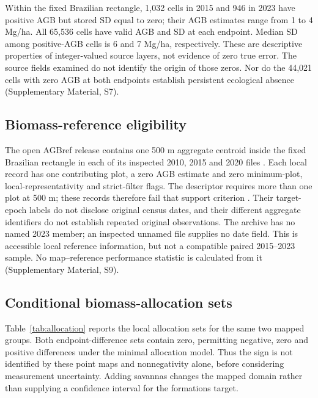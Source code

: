 \documentclass[11pt,a4paper]{article}
\begin{document}
Within the fixed Brazilian rectangle, 1,032 cells in 2015 and 946 in 2023 have positive AGB but stored SD equal to zero; their AGB estimates range from 1 to 4 Mg/ha. All 65,536 cells have valid AGB and SD at each endpoint. Median SD among positive-AGB cells is 6 and 7 Mg/ha, respectively. These are descriptive properties of integer-valued source layers, not evidence of zero true error. The source fields examined do not identify the origin of those zeros. Nor do the 44,021 cells with zero AGB at both endpoints establish persistent ecological absence (Supplementary Material, S7).

\subsection{Biomass-reference eligibility}

The open AGBref release contains one 500 m aggregate centroid inside the fixed Brazilian rectangle in each of its inspected 2010, 2015 and 2020 files \citep{AGBrefData2026}. Each local record has one contributing plot, a zero AGB estimate and zero minimum-plot, local-representativity and strict-filter flags. The descriptor requires more than one plot at 500 m; these records therefore fail that support criterion \citep{AGBref2026}. Their target-epoch labels do not disclose original census dates, and their different aggregate identifiers do not establish repeated original observations. The archive has no named 2023 member; an inspected unnamed file supplies no date field. This is accessible local reference information, but not a compatible paired 2015--2023 sample. No map--reference performance statistic is calculated from it (Supplementary Material, S9).

\subsection{Conditional biomass-allocation sets}
Table~\ref{tab:allocation} reports the local allocation sets for the same two mapped groups. Both endpoint-difference sets contain zero, permitting negative, zero and positive differences under the minimal allocation model. Thus the sign is not identified by these point maps and nonnegativity alone, before considering measurement uncertainty. Adding savannas changes the mapped domain rather than supplying a confidence interval for the formations target.
\end{document}

